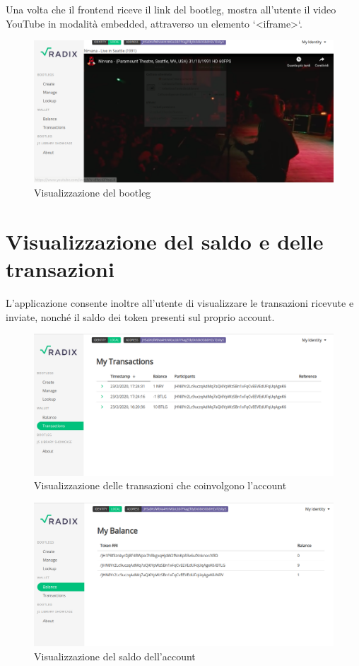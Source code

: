 Una volta che il frontend riceve il link del bootleg, mostra all'utente il video YouTube in modalità embedded, attraverso un elemento `<iframe>`.
\begin{figure}[H]
    \includegraphics[width=\linewidth]{images/application/watch.png}
    \caption{Visualizzazione del bootleg}
    \label{fig:watch}
\end{figure}

\section{Visualizzazione del saldo e delle transazioni}

L'applicazione consente inoltre all'utente di visualizzare le transazioni ricevute e inviate, nonché il saldo dei token presenti sul proprio account.

\begin{figure}[H]
    \includegraphics[width=\linewidth]{images/application/transactions.png}
    \caption{Visualizzazione delle transazioni che coinvolgono l'account}
    \label{fig:transactions}
\end{figure}

\begin{figure}[H]
    \includegraphics[width=\linewidth]{images/application/balance.png}
    \caption{Visualizzazione del saldo dell'account}
    \label{fig:balance}
\end{figure}